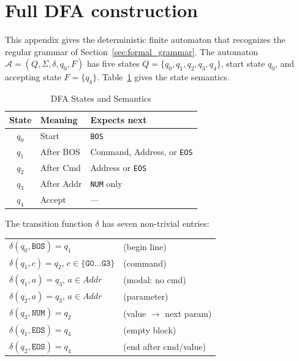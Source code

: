 \documentclass[11pt]{article}
\begin{document}
{\small


}

\appendix

\section{Full DFA construction}
\label{sec:dfa_construction}

This appendix gives the deterministic finite automaton that recognizes the regular grammar of Section~\ref{sec:formal_grammar}. The automaton $\mathcal{A} = (Q, \Sigma, \delta, q_0, F)$ has five states $Q = \{q_0, q_1, q_2, q_3, q_4\}$, start state $q_0$, and accepting state $F = \{q_4\}$. Table~\ref{tab:dfa_states} gives the state semantics.

\begin{table}[htbp]
\centering
\caption{DFA States and Semantics}
\label{tab:dfa_states}
\small
\begin{tabular}{@{}cll@{}}
\toprule
\textbf{State} & \textbf{Meaning} & \textbf{Expects next} \\
\midrule
$q_0$ & Start        & \texttt{BOS} \\
$q_1$ & After BOS    & Command, Address, or \texttt{EOS} \\
$q_2$ & After Cmd    & Address or \texttt{EOS} \\
$q_3$ & After Addr   & \texttt{NUM} only \\
$q_4$ & Accept       & --- \\
\bottomrule
\end{tabular}
\end{table}

The transition function $\delta$ has seven non-trivial entries:
\begin{center}
\small
\begin{tabular}{@{}ll@{}}
$\delta(q_0, \texttt{BOS}) = q_1$ & (begin line) \\
$\delta(q_1, c) = q_2$, $c \in \{\texttt{G0}\ldots\texttt{G3}\}$ & (command) \\
$\delta(q_1, a) = q_3$, $a \in \mathit{Addr}$ & (modal: no cmd) \\
$\delta(q_2, a) = q_3$, $a \in \mathit{Addr}$ & (parameter) \\
$\delta(q_3, \texttt{NUM}) = q_2$ & (value $\to$ next param) \\
$\delta(q_1, \texttt{EOS}) = q_4$ & (empty block) \\
$\delta(q_2, \texttt{EOS}) = q_4$ & (end after cmd/value) \\
\end{tabular}
\end{center}
\end{document}
